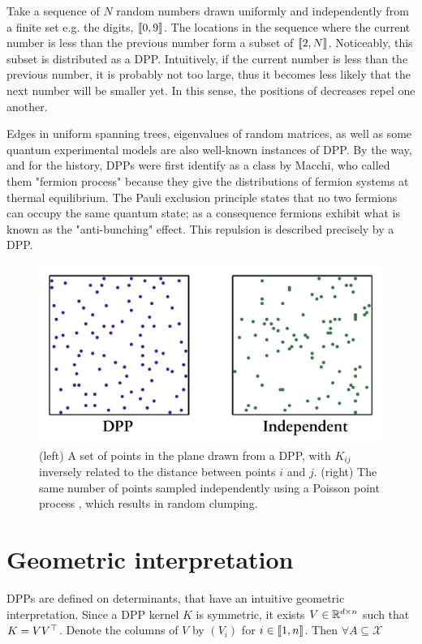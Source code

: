Take a sequence of $N$ random numbers drawn uniformly and independently from a finite set e.g. the digits, $\llbracket 0,9 \rrbracket$. The locations in the sequence where the current number is less than the previous number form a subset of  $\llbracket 2,N \rrbracket$. Noticeably, this subset is distributed as a DPP. Intuitively, if the current number is less than the previous number, it is probably not too large, thus it becomes less likely that the next number will be smaller yet. In this sense, the positions of decreases repel one another.

Edges in uniform spanning trees, eigenvalues of random matrices, as well as some quantum experimental models are also well-known instances of DPP. By the way, and for the history, DPPs were first identify as a class by Macchi, who called them "fermion process" because they give the distributions of fermion systems at thermal equilibrium. The Pauli exclusion principle states that no two fermions can occupy the same quantum state; as a consequence fermions exhibit what is known as the "anti-bunching" effect. This repulsion is described precisely by a DPP.

\begin{figure}[!ht]
    \centering
    \includegraphics[width=0.6\linewidth]{pics/dpp_vs_iid.png}
    \caption{(left) A set of points in the plane drawn from a DPP, with $K_{i j}$ inversely related to the distance between points $i$ and $j$. (right) The same number of points sampled independently using a Poisson point process , which results in random clumping.}
    \label{fig_dpp_vs_iid}
\end{figure}



\section{Geometric interpretation}
DPPs are defined on determinants, that have an intuitive geometric interpretation. Since a DPP kernel $K$ is symmetric, it exists $V \in \mathbb{R}^{d \times n}$ such that $K= V V^\top$. 
Denote the columns of $V$ by $(V_i)$ for $i\in \llbracket 1,n \rrbracket$. Then $\forall A \subseteq \mathcal{X}$

